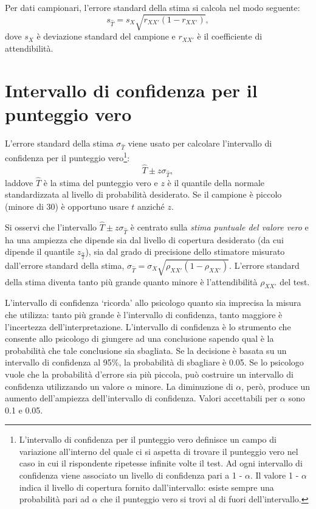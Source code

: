 Per dati campionari, l'errore standard della stima si calcola nel modo seguente:
$$
s_{\hat{T}} = s_X \sqrt{r_{XX'} (1-r_{XX'})}, 
$$
dove $s_X$ è deviazione standard del campione e $r_{XX'}$ è il
coefficiente di attendibilità.


\section{Intervallo di confidenza per il punteggio vero}

L'errore standard della stima $\sigma_{\hat{T}}$ viene usato per 
calcolare l'intervallo di confidenza per il punteggio vero\footnote{
L'intervallo di confidenza per il punteggio vero definisce un campo di variazione all'interno del quale ci si aspetta di trovare il punteggio vero nel caso in cui il rispondente ripetesse infinite volte il test. Ad ogni intervallo di confidenza viene associato un livello di confidenza pari a 1 - $\alpha$. Il valore 1 - $\alpha$ indica il livello di copertura fornito dall'intervallo: esiste sempre una probabilità pari ad $\alpha$ che il punteggio vero si trovi al di fuori dell'intervallo.
}:
\begin{equation}
\hat{T} \pm z  \sigma_{\hat{T}},
\end{equation}
laddove $\hat{T}$ è la stima del punteggio vero e $z$ è il quantile della normale standardizzata al livello di probabilità desiderato. Se il campione è piccolo (minore di 30) è opportuno usare $t$ anziché $z$. 

Si osservi che l'intervallo $\hat{T} \pm z  \sigma_{\hat{T}}$ è centrato sulla 
\textit{stima puntuale del valore vero} e ha una ampiezza che dipende sia dal livello di copertura desiderato (da cui dipende il quantile $z_{\frac{\alpha}{2}}$), sia dal grado di precisione dello stimatore misurato dall'errore standard della stima, $\sigma_{\hat{T}} = \sigma_X \sqrt{\rho_{XX'} (1 -\rho_{XX'})}$.  L'errore standard della stima diventa tanto più grande quanto minore è l'attendibilità $\rho_{XX'}$ del test.
 
L'intervallo di confidenza `ricorda' allo psicologo quanto sia imprecisa la misura che utilizza: tanto più grande è l'intervallo di confidenza, tanto maggiore è l'incertezza dell'interpretazione. L'intervallo di confidenza è lo strumento che consente allo psicologo di giungere ad una conclusione sapendo qual è la probabilità che tale conclusione sia sbagliata. 
Se la decisione è basata su un intervallo di confidenza al 95\%, la probabilità di sbagliare è 0.05. 
Se lo psicologo vuole che la probabilità d'errore sia più piccola, può costruire un intervallo di confidenza utilizzando un valore $\alpha$ minore. 
La diminuzione di $\alpha$, però, produce un aumento dell'ampiezza dell'intervallo di confidenza. 
Valori accettabili per $\alpha$ sono 0.1 e 0.05.

